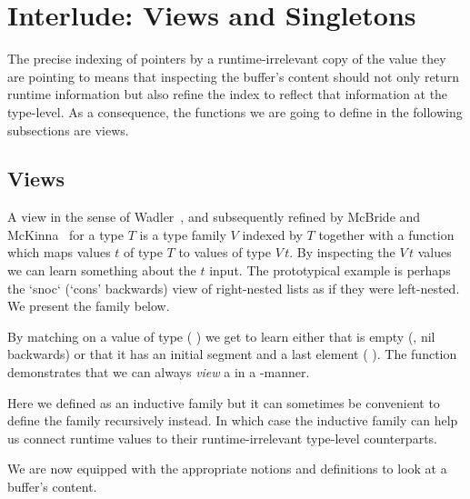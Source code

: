 
\section{Interlude: Views and Singletons}\label{sec:view}

The precise indexing of pointers by a runtime-irrelevant copy of the value
they are pointing to means that inspecting the buffer's content should
not only return runtime information but also refine the index to reflect
that information at the type-level.
%
As a consequence, the functions we are going to define in the following
subsections are views.

\subsection{Views}

A view
in the sense of Wadler~\citep{DBLP:conf/popl/Wadler87},
and subsequently refined by McBride and McKinna~\citep{DBLP:journals/jfp/McBrideM04}
for a type $T$ is a type family $V$ indexed by $T$ together
with a function which maps values $t$ of type $T$ to values of type
$V\,t$.
%
By inspecting the $V\,t$ values we can learn something about the
$t$ input.
%
The prototypical example is perhaps the `snoc` (`cons' backwards) view
of right-nested lists as if they were left-nested.
We present the  family below.


By matching on a value of type
( ) we get to learn
either that  is empty (, nil backwards)
or that it has an initial segment  and a last element
 ( \IdrisData{:<} ).
%
The function  demonstrates that we can always
\emph{view} a  in a -manner.


Here we defined  as an inductive family but it can
sometimes be convenient to define the family recursively instead.
In which case the  inductive family can
help us connect runtime values to their
runtime-irrelevant type-level counterparts.



We are now equipped with the appropriate notions and definitions to
look at a buffer's content.
